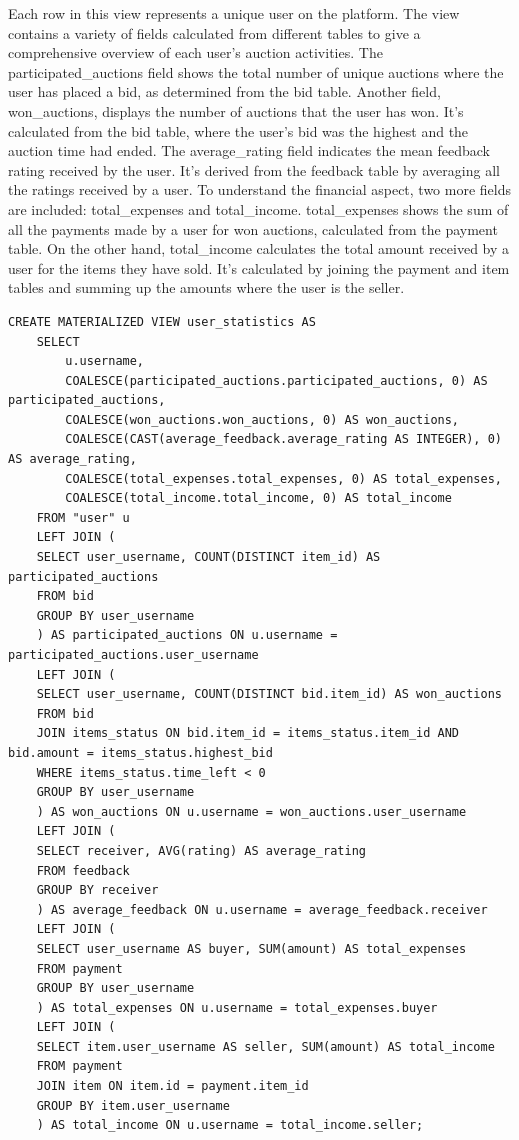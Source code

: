Each row in this view represents a unique user on the platform. The view contains a variety of fields calculated from different tables to give a comprehensive overview of each user's auction activities. The participated\_auctions field shows the total number of unique auctions where the user has placed a bid, as determined from the bid table. Another field, won\_auctions, displays the number of auctions that the user has won. It's calculated from the bid table, where the user's bid was the highest and the auction time had ended. The average\_rating field indicates the mean feedback rating received by the user. It's derived from the feedback table by averaging all the ratings received by a user.
To understand the financial aspect, two more fields are included: total\_expenses and total\_income. total\_expenses shows the sum of all the payments made by a user for won auctions, calculated from the payment table. On the other hand, total\_income calculates the total amount received by a user for the items they have sold. It's calculated by joining the payment and item tables and summing up the amounts where the user is the seller.

\vspace{0.2cm}
\begin{lstlisting}[style=sqlStyle]
	CREATE MATERIALIZED VIEW user_statistics AS
	SELECT 
		u.username,
		COALESCE(participated_auctions.participated_auctions, 0) AS participated_auctions,
		COALESCE(won_auctions.won_auctions, 0) AS won_auctions,
		COALESCE(CAST(average_feedback.average_rating AS INTEGER), 0) AS average_rating,
		COALESCE(total_expenses.total_expenses, 0) AS total_expenses,
		COALESCE(total_income.total_income, 0) AS total_income
	FROM "user" u
	LEFT JOIN (
	SELECT user_username, COUNT(DISTINCT item_id) AS participated_auctions
	FROM bid
	GROUP BY user_username
	) AS participated_auctions ON u.username = participated_auctions.user_username
	LEFT JOIN (
	SELECT user_username, COUNT(DISTINCT bid.item_id) AS won_auctions
	FROM bid
	JOIN items_status ON bid.item_id = items_status.item_id AND bid.amount = items_status.highest_bid
	WHERE items_status.time_left < 0
	GROUP BY user_username
	) AS won_auctions ON u.username = won_auctions.user_username
	LEFT JOIN (
	SELECT receiver, AVG(rating) AS average_rating
	FROM feedback
	GROUP BY receiver
	) AS average_feedback ON u.username = average_feedback.receiver
	LEFT JOIN (
	SELECT user_username AS buyer, SUM(amount) AS total_expenses
	FROM payment
	GROUP BY user_username
	) AS total_expenses ON u.username = total_expenses.buyer
	LEFT JOIN (
	SELECT item.user_username AS seller, SUM(amount) AS total_income
	FROM payment
	JOIN item ON item.id = payment.item_id
	GROUP BY item.user_username
	) AS total_income ON u.username = total_income.seller;
\end{lstlisting}

